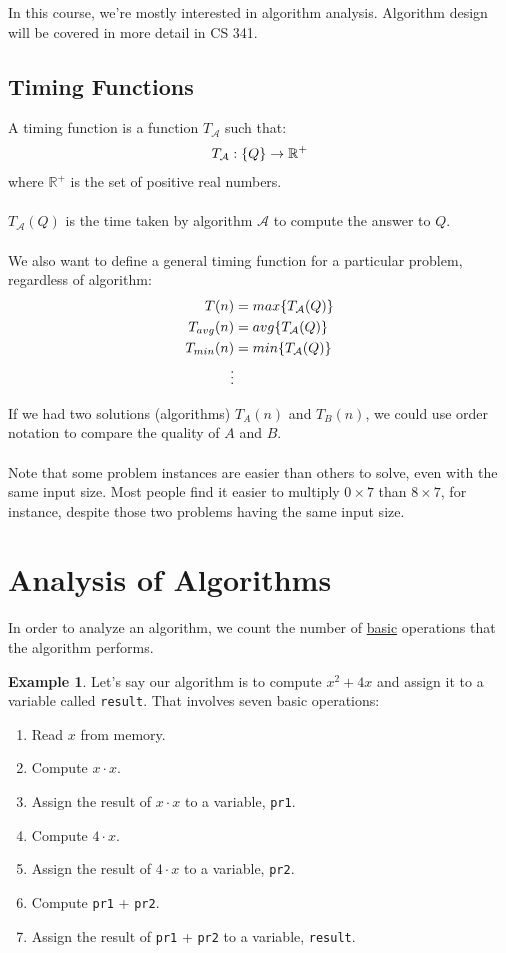 \documentclass[]{article}
\theoremstyle{definition}
\newtheorem{ex}{Example}[section]
\DeclarePairedDelimiter{\set}{\lbrace}{\rbrace}
\begin{document}
		In this course, we're mostly interested in algorithm analysis. Algorithm design will be covered in more detail in CS 341.

		\subsection{Timing Functions}
			A timing function is a function $T_{\mathcal{A}}$ such that:
			\begin{align*}
				T_{\mathcal{A}}: \set{Q } \to \mathbb{R}^{+}
			\end{align*}
			where $\mathbb{R}^{+}$ is the set of positive real numbers.
			\\ \\
			$T_{\mathcal{A}}(Q)$ is the time taken by algorithm $\mathcal{A}$ to compute the answer to $Q$.
			\\ \\
			We also want to define a general timing function for a particular problem, regardless of algorithm:
			\begin{align*}
				T(n) &= max \set{T_{ \mathcal{A}}(Q) } \\
				T_{avg}(n) &= avg \set{T_{\mathcal{A}}(Q) } \\
				T_{min}(n) &= min \set{T_{\mathcal{A}}(Q) } \\
				\vdots&
			\end{align*}

			If we had two solutions (algorithms) $T_A(n)$ and $T_B(n)$, we could use order notation to compare the quality of $A$ and $B$.
			\\ \\
			Note that some problem instances are easier than others to solve, even with the same input size. Most people find it easier to multiply $0 \times 7$ than $8 \times 7$, for instance, despite those two problems having the same input size.
	\section{Analysis of Algorithms}
		In order to analyze an algorithm, we count the number of \underline{basic} operations that the algorithm performs.
		\begin{ex}
			Let's say our algorithm is to compute $x^2 + 4x$ and assign it to a variable called \verb+result+. That involves seven basic operations:
			\begin{enumerate}
				\item Read $x$ from memory.
				\item Compute $x \cdot x$.
				\item Assign the result of $x \cdot x$ to a variable, \verb+pr1+.
				\item Compute $4 \cdot x$.
				\item Assign the result of $4 \cdot x$ to a variable, \verb+pr2+.
				\item Compute \verb+pr1+ + \verb+pr2+.
				\item Assign the result of \verb+pr1+ + \verb+pr2+ to a variable, \verb+result+.
			\end{enumerate}
		\end{ex}
\end{document}
